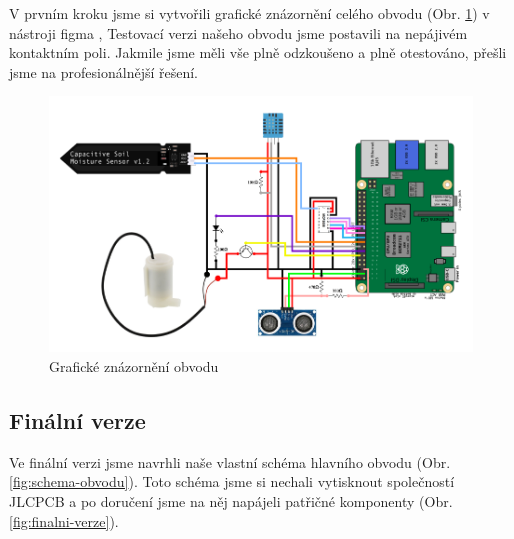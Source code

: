 \documentclass[czech,12pt,a4paper]{article}
\begin{document}
V prvním kroku jsme si vytvořili grafické znázornění celého obvodu (Obr. \ref{fig:graficke-znazorneni-obvodu}) v nástroji figma \cite{figma}, Testovací verzi našeho obvodu jsme postavili na nepájivém kontaktním poli. Jakmile jsme měli vše plně odzkoušeno a plně otestováno, přešli jsme na profesionálnější řešení.

\noindent\begin{figure}[h]
	\includegraphics[width=\linewidth]{obvod.png}
	\caption{Grafické znázornění obvodu}
	\label{fig:graficke-znazorneni-obvodu}
\end{figure}

\clearpage

\subsection{Finální verze}

Ve finální verzi jsme navrhli naše vlastní schéma hlavního obvodu (Obr. \ref{fig:schema-obvodu}). Toto schéma jsme si nechali vytisknout společností JLCPCB a po doručení jsme na něj napájeli patřičné komponenty (Obr. \ref{fig:finalni-verze}).
\end{document}
